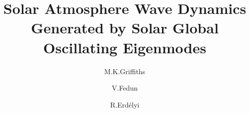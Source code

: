 \documentclass[authoryear,final,1p]{elsarticle}
\begin{document}
\title{Solar Atmosphere Wave Dynamics Generated by Solar Global  Oscillating Eigenmodes}
\author[swat,cics]{M.K.Griffiths }
\author[acse]{V.Fedun}
\author[swat]{R.Erd\'{e}lyi}
\address[swat]{Solar Physics and Space Plasma Research Centre ($SP^{2}RC$), School of Mathematics and Statistics, University of Sheffield, Hicks Building, Hounsfield Road, S7 3RH, UK}
\address[cics]{Corporate Information and Computing Services, The University of Sheffield, 10-12 Brunswick Street, Sheffield, S10 2FN, UK}
\address[acse]{Department of Automatic Control and Systems Engineering, The University of Sheffield, Mappin Street, Sheffield, S1 3JD, UK}
\end{document}
